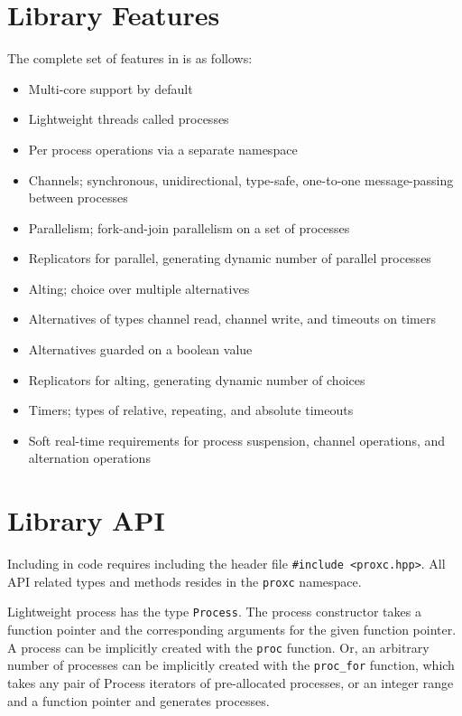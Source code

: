 \section{Library Features}
\label{sec:library_features}


The complete set of features in \Proxc{} is as follows:

\begin{itemize}[topsep=0em,itemsep=-1em,partopsep=0.5em,parsep=1em]
    \item Multi\hyp{}core support by default
    \item Lightweight threads called processes
    \item Per process operations via a separate namespace
    \item Channels; synchronous, unidirectional, type\hyp{}safe, one\hyp{}to\hyp{}one message\hyp{}passing between processes
    \item Parallelism; fork\hyp{}and\hyp{}join parallelism on a set of processes
    \item Replicators for parallel, generating dynamic number of parallel processes
    \item Alting; choice over multiple alternatives
    \item Alternatives of types channel read, channel write, and timeouts on timers
    \item Alternatives guarded on a boolean value
    \item Replicators for alting, generating dynamic number of choices
    \item Timers; types of relative, repeating, and absolute timeouts
    \item Soft real\hyp{}time requirements for process suspension, channel operations, and alternation operations
\end{itemize}


\section{Library API}
\label{sec:library_api}


Including \Proxc{} in code requires including the header file \lstinline[style={CustomC++}]|#include <proxc.hpp>|. All API related types and methods resides in the \lstinline[style={CustomC++}]|proxc| namespace. 

Lightweight process has the type \lstinline[style={CustomC++}]|Process|. The process constructor takes a function pointer and the corresponding arguments for the given function pointer. A process can be implicitly created with the \lstinline[style={CustomC++}]|proc| function. Or, an arbitrary number of processes can be implicitly created with the \lstinline[style={CustomC++}]|proc_for| function, which takes any pair of Process iterators of pre\hyp{}allocated processes, or an integer range and a function pointer and generates processes.

